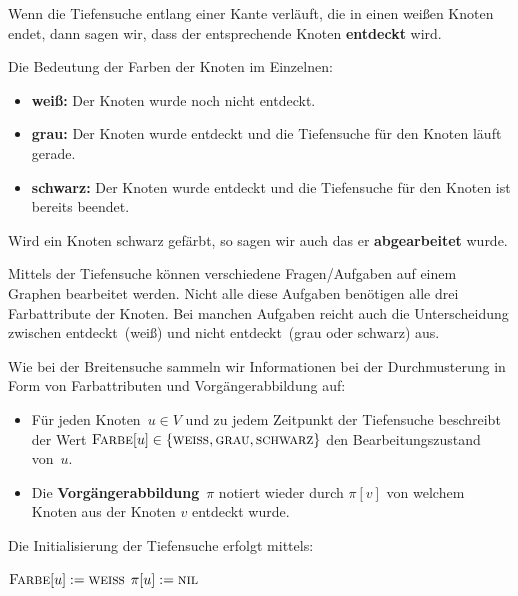 \begin{defn}
	Wenn die Tiefensuche entlang einer Kante verläuft, die in einen weißen Knoten endet, dann sagen wir, dass der entsprechende Knoten \textbf{entdeckt} wird.

Die Bedeutung der Farben der Knoten im Einzelnen:
\begin{itemize}
	\item[] {\bfseries weiß:} Der Knoten wurde noch nicht entdeckt. 
	\item[] {\bfseries grau:} Der Knoten wurde entdeckt und die Tiefensuche für den Knoten läuft gerade.
	\item[] {\bfseries schwarz:} Der Knoten wurde entdeckt und die Tiefensuche für den Knoten ist bereits beendet.
\end{itemize}
%
Wird ein Knoten schwarz gefärbt, so sagen wir auch das er \textbf{abgearbeitet} wurde.

Mittels der Tiefensuche können verschiedene Fragen/Aufgaben auf einem Graphen bearbeitet werden. Nicht alle diese Aufgaben benötigen alle drei Farbattribute der Knoten. Bei manchen Aufgaben reicht auch die Unterscheidung zwischen \glqq entdeckt\grqq\ (weiß) und \glqq nicht entdeckt\grqq\ (grau oder schwarz) aus. 
\end{defn}

\begin{bem}
Wie bei der Breitensuche sammeln wir Informationen bei der Durchmusterung in Form von Farbattributen und Vorgängerabbildung auf:
\begin{itemize}
 \item Für jeden Knoten~$u \in V$ und zu jedem Zeitpunkt der Tiefensuche beschreibt der Wert $\mathop{\text{\textsc{Farbe}}}[u] \in \{\mathop{\text{\textsc{weiß}}}, \mathop{\text{\textsc{grau}}}, \mathop{\text{\textsc{schwarz}}}\}$ den Bearbeitungszustand von~$u$.
 \item Die \textbf{Vorgängerabbildung}~$\pi$ notiert wieder durch $\pi[v]$ von welchem Knoten aus der Knoten $v$ entdeckt wurde.
\end{itemize}
\end{bem}  

\begin{bem}
Die Initialisierung der Tiefensuche erfolgt mittels: 
\begin{algorithm} 
\caption{$\cc{Tiefensuche-Initialisieren}(D)$}
\begin{algorithmic}[1]
  \STATE $\mathop{\text{\textsc{Farbe}}}[u]:=\mathop{\text{\textsc{weiß}}}$
  \STATE $\pi[u]:=\mathop{\text{\textsc{nil}}}$
 \ENDFOR
\end{algorithmic}
\end{algorithm} 
\end{bem}  


